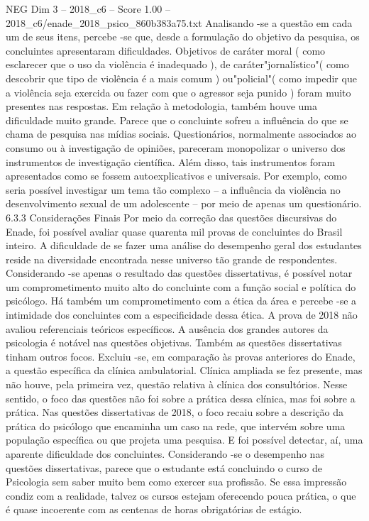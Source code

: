 \begin{textsample}{NEG Dim 3 – 2018\_c6 – Score 1.00 – 2018\_c6/enade\_2018\_psico\_860b383a75.txt}
Analisando -se a questão em cada um de seus itens, percebe -se que, desde a formulação do objetivo da pesquisa, os concluintes apresentaram dificuldades.
Objetivos de caráter moral ( como esclarecer que o uso da violência é inadequado ), de caráter"jornalístico"( como descobrir que tipo de violência é a mais comum ) ou"policial"( como impedir que a violência seja exercida ou fazer com que o agressor seja punido ) foram muito presentes nas respostas.
Em relação à metodologia, também houve uma dificuldade muito grande.
Parece que o concluinte sofreu a influência do que se chama de pesquisa nas mídias sociais.
Questionários, normalmente associados ao consumo ou à investigação de opiniões, pareceram monopolizar o universo dos instrumentos de investigação científica.
Além disso, tais instrumentos foram apresentados como se fossem autoexplicativos e universais.
Por exemplo, como seria possível investigar um tema tão complexo – a influência da violência no desenvolvimento sexual de um adolescente – por meio de apenas um questionário. 6.3.3 Considerações Finais Por meio da correção das questões discursivas do Enade, foi possível avaliar quase quarenta mil provas de concluintes do Brasil inteiro.
A dificuldade de se fazer uma análise do desempenho geral dos estudantes reside na diversidade encontrada nesse universo tão grande de respondentes.
Considerando -se apenas o resultado das questões dissertativas, é possível notar um comprometimento muito alto do concluinte com a função social e política do psicólogo.
Há também um comprometimento com a ética da área e percebe -se a intimidade dos concluintes com a especificidade dessa ética.
A prova de 2018 não avaliou referenciais teóricos específicos.
A ausência dos grandes autores da psicologia é notável nas questões objetivas.
Também as questões dissertativas tinham outros focos.
Excluiu -se, em comparação às provas anteriores do Enade, a questão específica da clínica ambulatorial.
Clínica ampliada se fez presente, mas não houve, pela primeira vez, questão relativa à clínica dos consultórios.
Nesse sentido, o foco das questões não foi sobre a prática dessa clínica, mas foi sobre a prática.
Nas questões dissertativas de 2018, o foco recaiu sobre a descrição da prática do psicólogo que encaminha um caso na rede, que intervém sobre uma população específica ou que projeta uma pesquisa.
E foi possível detectar, aí, uma aparente dificuldade dos concluintes.
Considerando -se o desempenho nas questões dissertativas, parece que o estudante está concluindo o curso de Psicologia sem saber muito bem como exercer sua profissão.
Se essa impressão condiz com a realidade, talvez os cursos estejam oferecendo pouca prática, o que é quase incoerente com as centenas de horas obrigatórias de estágio.

\end{textsample}
